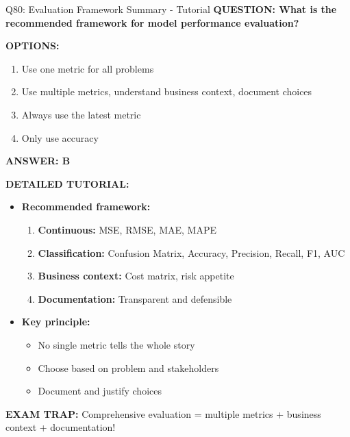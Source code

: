 \documentclass[8pt]{beamer}
\begin{document}
\begin{frame}{Q80: Evaluation Framework Summary - Tutorial}
	\fontsize{6.5}{7.5}\selectfont
	\textbf{QUESTION: What is the recommended framework for model performance evaluation?}
	
	\vspace{0.1cm}
	\textbf{OPTIONS:}
	\begin{enumerate}
		\item Use one metric for all problems
		\item Use multiple metrics, understand business context, document choices
		\item Always use the latest metric
		\item Only use accuracy
	\end{enumerate}
	
	\vspace{0.1cm}
	\textcolor{myblue}{\textbf{ANSWER: B}}
	
	\vspace{0.1cm}
	\textbf{DETAILED TUTORIAL:}
	\begin{itemize}
		\item \textbf{Recommended framework:}
		\begin{enumerate}
			\item \textbf{Continuous:} MSE, RMSE, MAE, MAPE
			\item \textbf{Classification:} Confusion Matrix, Accuracy, Precision, Recall, F1, AUC
			\item \textbf{Business context:} Cost matrix, risk appetite
			\item \textbf{Documentation:} Transparent and defensible
		\end{enumerate}
		\item \textbf{Key principle:}
		\begin{itemize}
			\item No single metric tells the whole story
			\item Choose based on problem and stakeholders
			\item Document and justify choices
		\end{itemize}
	\end{itemize}
	
	\textcolor{myred}{\textbf{EXAM TRAP:}} Comprehensive evaluation = \textcolor{myblue}{multiple metrics + business context + documentation}!
\end{frame}

\end{document}
